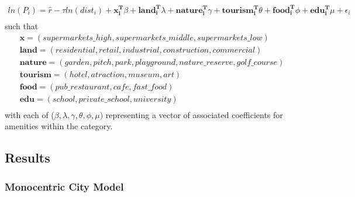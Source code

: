 \documentclass{article}
\begin{document}
\begin{gather*}
ln(P_i) = \hat{r} - \tau ln(dist_i) + \boldsymbol{x_i^{T}} \beta + \boldsymbol{land_i^{T}}\lambda + \boldsymbol{nature_i^{T}} \gamma + \boldsymbol{tourism_i^{T}} \theta + \boldsymbol{food_i^{T}} \phi + \boldsymbol{edu_i^{T}} \mu + \epsilon_i \\
\end{gather*}
such that
\begin{gather*}
\boldsymbol{x} = (supermarkets\_high, supermarkets\_middle, supermarkets\_low) \\
\boldsymbol{land} = (residential, retail, industrial, construction, commercial) \\
\boldsymbol{nature} = (garden, pitch, park, playground, nature\_reserve, golf\_course) \\
\boldsymbol{tourism} = (hotel, atraction, museum, art) \\
\boldsymbol{food} = (pub\_restaurant, cafe, fast\_food) \\ 
\boldsymbol{edu} = (school, private\_school, university) \\ 
\end{gather*}
with each of ($\beta, \lambda, \gamma, \theta, \phi, \mu)$ representing a vector of associated coefficients for amenities within the category.  


\subsection{Results}
\subsubsection{Monocentric City Model}
\end{document}
